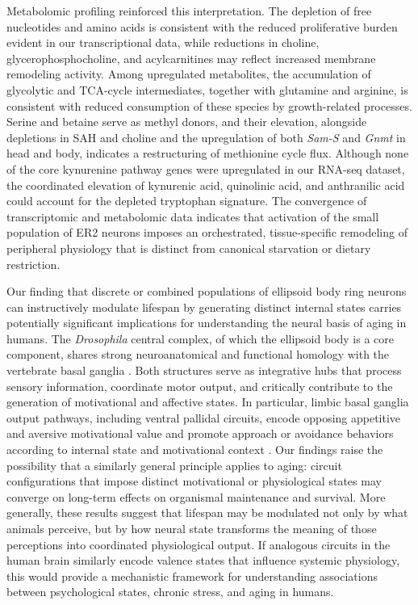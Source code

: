 Metabolomic profiling reinforced this interpretation.
The depletion of free nucleotides and amino acids is consistent with the reduced proliferative burden evident in our transcriptional data, while reductions in choline, glycerophosphocholine, and acylcarnitines may reflect increased membrane remodeling activity.
Among upregulated metabolites, the accumulation of glycolytic and TCA-cycle intermediates, together with glutamine and arginine, is consistent with reduced consumption of these species by growth-related processes.
Serine and betaine serve as methyl donors, and their elevation, alongside depletions in SAH and choline and the upregulation of both \textit{Sam-S} and \textit{Gnmt} in head and body, indicates a restructuring of methionine cycle flux.
Although none of the core kynurenine pathway genes were upregulated in our RNA-seq dataset, the coordinated elevation of kynurenic acid, quinolinic acid, and anthranilic acid could account for the depleted tryptophan signature.
The convergence of transcriptomic and metabolomic data indicates that activation of the small population of ER2 neurons imposes an orchestrated, tissue-specific remodeling of peripheral physiology that is distinct from canonical starvation or dietary restriction.

Our finding that discrete or combined populations of ellipsoid body ring neurons can instructively modulate lifespan by generating distinct internal states carries potentially significant implications for understanding the neural basis of aging in humans.
The \textit{Drosophila} central complex, of which the ellipsoid body is a core component, shares strong neuroanatomical and functional homology with the vertebrate basal ganglia \citep{strausfeld2013}.
Both structures serve as integrative hubs that process sensory information, coordinate motor output, and critically contribute to the generation of motivational and affective states.
In particular, limbic basal ganglia output pathways, including ventral pallidal circuits, encode opposing appetitive and aversive motivational value and promote approach or avoidance behaviors according to internal state and motivational context \citep{stephenson-jones2020}.
Our findings raise the possibility that a similarly general principle applies to aging: circuit configurations that impose distinct motivational or physiological states may converge on long-term effects on organismal maintenance and survival.
More generally, these results suggest that lifespan may be modulated not only by what animals perceive, but by how neural state transforms the meaning of those perceptions into coordinated physiological output.
If analogous circuits in the human brain similarly encode valence states that influence systemic physiology, this would provide a mechanistic framework for understanding associations between psychological states, chronic stress, and aging in humans.


